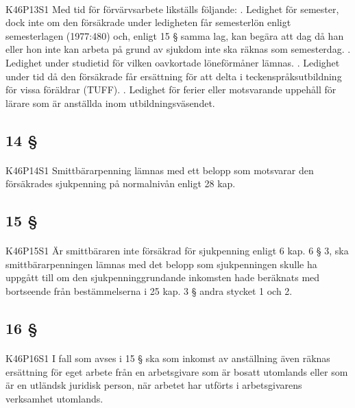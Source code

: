 \documentclass[a4paper,notitlepage,openany,10pt]{book}
\begin{document}
\paragraph*{}
{\tiny K46P13S1}
Med tid för förvärvsarbete likställs följande:
. Ledighet för semester, dock inte om den försäkrade under ledigheten får semesterlön enligt semesterlagen (1977:480) och, enligt 15 § samma lag, kan begära att dag då han eller hon inte kan arbeta på grund av sjukdom inte ska räknas som semesterdag.
. Ledighet under studietid för vilken oavkortade löneförmåner lämnas.
. Ledighet under tid då den försäkrade får ersättning för att delta i teckenspråksutbildning för vissa föräldrar (TUFF).
. Ledighet för ferier eller motsvarande uppehåll för lärare som är anställda inom utbildningsväsendet.
\subsection*{14 §}
\paragraph*{}
{\tiny K46P14S1}
Smittbärarpenning lämnas med ett belopp som motsvarar den försäkrades sjukpenning på normalnivån enligt 28 kap.
\subsection*{15 §}
\paragraph*{}
{\tiny K46P15S1}
Är smittbäraren inte försäkrad för sjukpenning enligt 6 kap. 6 § 3, ska smittbärarpenningen lämnas med det belopp som sjukpenningen skulle ha uppgått till om den sjukpenninggrundande inkomsten hade beräknats med bortseende från bestämmelserna i 25 kap. 3 § andra stycket 1 och 2.
\subsection*{16 §}
\paragraph*{}
{\tiny K46P16S1}
I fall som avses i 15 § ska som inkomst av anställning även räknas ersättning för eget arbete från en arbetsgivare som är bosatt utomlands eller som är en utländsk juridisk person, när arbetet har utförts i arbetsgivarens verksamhet utomlands.
\end{document}
